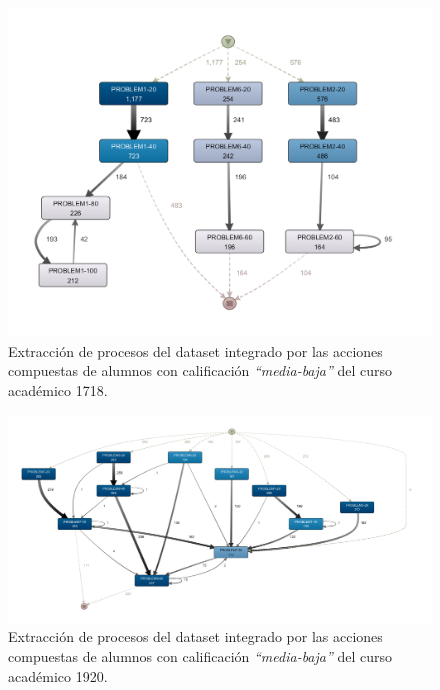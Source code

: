 \begin{figure}[H]
    \centering
    \includegraphics[width=1.25\textwidth]{imagenes/Year1718MidLowGrades.png}
    \caption{Extracción de procesos del dataset integrado por las acciones compuestas de alumnos con calificación \emph{``media-baja''} del curso académico 1718.}
    \label{fig:year1718MidLowGrades}
\end{figure}

\begin{figure}[H]
    \centering
    \includegraphics[width=1.25\textwidth]{imagenes/Year1920MidLowGrades.png}
    \caption{Extracción de procesos del dataset integrado por las acciones compuestas de alumnos con calificación \emph{``media-baja''} del curso académico 1920.}
    \label{fig:year1920MidLowGrades}
\end{figure}

